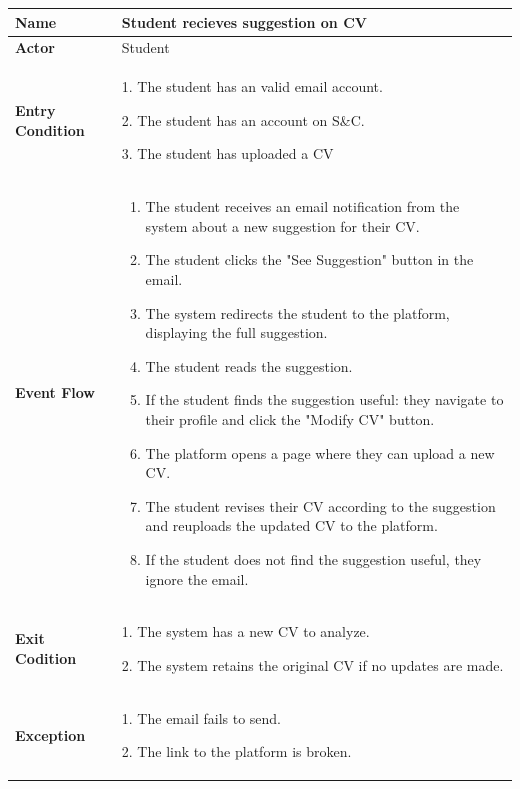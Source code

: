 \begin{longtable}{|p{}|p{}|}
\hline
\textbf{Name} &  Student recieves suggestion on CV\\
\hline
\textbf{Actor} &  Student\\
\hline
\textbf{Entry Condition} &  
1. The student has an valid email account.

2. The student has an account on S\&C. 

3. The student has uploaded a CV\\
\hline
\textbf{Event Flow} &  
\begin{enumerate}
    \item The student receives an email notification from the system about a new suggestion for their CV.
    \item The student clicks the "See Suggestion" button in the email.
    \item  The system redirects the student to the platform, displaying the full suggestion.
    \item The student reads the suggestion.
    \item If the student finds the suggestion useful: they navigate to their profile and click the "Modify CV" button.
    \item The platform opens a page where they can upload a new CV.
    \item The student revises their CV according to the suggestion and reuploads the updated CV to the platform.
    \item If the student does not find the suggestion useful, they ignore the email.
\end{enumerate}\\
\hline
\textbf{Exit Codition} &  
1. The system has a new CV to analyze.

2. The system retains the original CV if no updates are made.\\
\hline
\textbf{Exception} &  
1. The email fails to send.

2. The link to the platform is broken.\\
\hline
\end{longtable}

